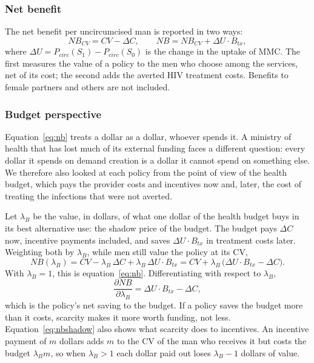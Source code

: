 \documentclass[11pt]{article}
\numberwithin{equation}{section}\numberwithin{figure}{section}\numberwithin{table}{section}
\begin{document}
\subsubsection{Net benefit}
The net benefit per uncircumcised man is reported in two ways:
\begin{equation}\label{eq:nb}
NB_{CV} = CV - \Delta C, \qquad NB = NB_{CV} + \Delta U \cdot B_{tx},
\end{equation}
where $\Delta U = P_{circ}(S_1) - P_{circ}(S_0)$ is the change in the uptake of MMC. The first measures the value of a policy to the men who choose among the services, net of its cost; the second adds the averted HIV treatment costs. Benefits to female partners and others are not included.

\subsubsection{Budget perspective}\label{sec:budget}
Equation~\ref{eq:nb} treats a dollar as a dollar, whoever spends it. A ministry of health that has lost much of its external funding faces a different question: every dollar it spends on demand creation is a dollar it cannot spend on something else. We therefore also looked at each policy from the point of view of the health budget, which pays the provider costs and incentives now and, later, the cost of treating the infections that were not averted.

Let $\lambda_B$ be the value, in dollars, of what one dollar of the health budget buys in its best alternative use: the shadow price of the budget. The budget pays $\Delta C$ now, incentive payments included, and saves $\Delta U \cdot B_{tx}$ in treatment costs later. Weighting both by $\lambda_B$, while men still value the policy at its CV,
\begin{equation}\label{eq:nbshadow}
NB(\lambda_B) = CV - \lambda_B\,\Delta C + \lambda_B\,\Delta U \cdot B_{tx} = CV + \lambda_B\,\big(\Delta U \cdot B_{tx} - \Delta C\big).
\end{equation}
With $\lambda_B = 1$, this is equation~\ref{eq:nb}. Differentiating with respect to $\lambda_B$,
\begin{equation}\label{eq:dnb}
\frac{\partial NB}{\partial \lambda_B} = \Delta U \cdot B_{tx} - \Delta C,
\end{equation}
which is the policy's net saving to the budget. If a policy saves the budget more than it costs, scarcity makes it more worth funding, not less. Equation~\ref{eq:nbshadow} also shows what scarcity does to incentives. An incentive payment of $m$ dollars adds $m$ to the CV of the man who receives it but costs the budget $\lambda_B m$, so when $\lambda_B > 1$ each dollar paid out loses $\lambda_B - 1$ dollars of value.
\end{document}
